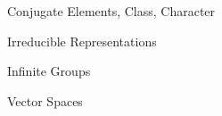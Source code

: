 \documentclass{beamer}
\begin{document}
\begin{frame}{Conjugate Elements, Class, Character}
\end{frame}

\begin{frame}{Irreducible Representations}
\end{frame}

\begin{frame}{Infinite Groups}
\end{frame}


\begin{frame}{Vector Spaces}
\end{frame}
\end{document}

